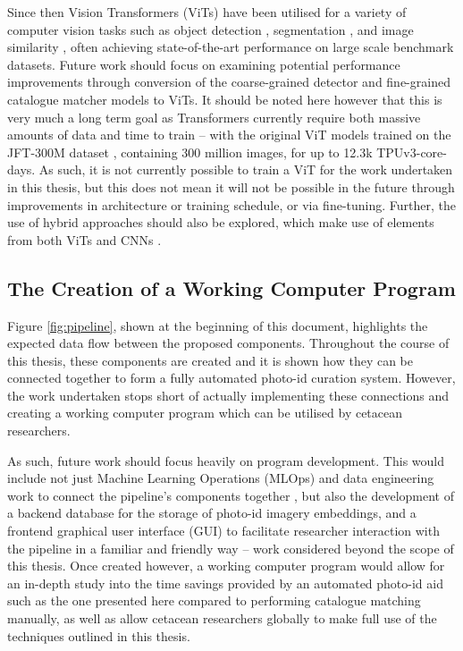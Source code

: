 Since then Vision Transformers (ViTs) have been utilised for a variety of computer vision tasks such as object detection \cite{fang_you_2021, li_exploring_2022}, segmentation \cite{hu_istr_2021, prangemeier_attention-based_2020, wang_end--end_2021}, and image similarity \cite{el-nouby_training_2021}, often achieving state-of-the-art performance on large scale benchmark datasets. Future work should focus on examining potential performance improvements through conversion of the coarse-grained detector and fine-grained catalogue matcher models to ViTs. It should be noted here however that this is very much a long term goal as Transformers currently require both massive amounts of data and time to train -- with the original ViT models trained on the JFT-300M dataset \cite{sun_revisiting_2017}, containing 300 million images, for up to 12.3k TPUv3-core-days. As such, it is not currently possible to train a ViT for the work undertaken in this thesis, but this does not mean it will not be possible in the future through improvements in architecture or training schedule, or via fine-tuning. Further, the use of hybrid approaches should also be explored, which make use of elements from both ViTs and CNNs \cite{liu_convnet_2022, liu_swin_2021}.

\subsection{The Creation of a Working Computer Program}\label{ch:Conclusion,sec:FutureWork,sub:GUI}

Figure \ref{fig:pipeline}, shown at the beginning of this document, highlights the expected data flow between the proposed components. Throughout the course of this thesis, these components are created and it is shown how they can be connected together to form a fully automated photo-id curation system. However, the work undertaken stops short of actually implementing these connections and creating a working computer program which can be utilised by cetacean researchers. 

As such, future work should focus heavily on program development. This would include not just Machine Learning Operations (MLOps) and data engineering work to connect the pipeline's components together \cite{zhou_towards_2020}, but also the development of a backend database for the storage of photo-id imagery embeddings, and a frontend graphical user interface (GUI) to facilitate researcher interaction with the pipeline in a familiar and friendly way -- work considered beyond the scope of this thesis. Once created however, a working computer program would allow for an in-depth study into the time savings provided by an automated photo-id aid such as the one presented here compared to performing catalogue matching manually, as well as allow cetacean researchers globally to make full use of the techniques outlined in this thesis. 

